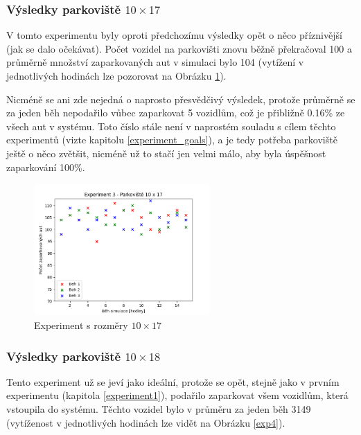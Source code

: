 \documentclass[11pt, a4paper]{article}
\begin{document}
\newpage

\subsubsection{Výsledky parkoviště \texorpdfstring{$10 \times 17$}{10 x 17}}
\label{experiment3}

V tomto experimentu byly oproti předchozímu výsledky opět o něco příznivější (jak se dalo očekávat). Počet vozidel na parkovišti znovu běžně překračoval 100 a průměrně množství zaparkovaných aut v simulaci bylo 104 (vytížení v jednotlivých hodinách lze pozorovat na Obrázku \ref{exp3}).

Nicméně se ani zde nejedná o naprosto přesvědčivý výsledek, protože průměrně se za jeden běh nepodařilo vůbec zaparkovat 5 vozidlům, což je přibližně 0.16\% ze všech aut v systému. Toto číslo stále není v naprostém souladu s cílem těchto experimentů (vizte kapitolu \ref{experiment_goals}), a je tedy potřeba parkoviště ještě o něco zvětšit, nicméně už to stačí jen velmi málo, aby byla úspěšnost zaparkování 100\%.

\begin{figure}[ht]
  \centering
  \includegraphics[width=0.6\textwidth]{img/exp3.png}
  \caption{Experiment s rozměry $10 \times 17$}
  \label{exp3}
\end{figure}

\newpage

\subsubsection{Výsledky parkoviště \texorpdfstring{$10 \times 18$}{10 x 18}}
\label{experiment4}

Tento experiment už se jeví jako ideální, protože se opět, stejně jako v prvním experimentu (kapitola \ref{experiment1}), podařilo zaparkovat všem vozidlům, která vstoupila do systému. Těchto vozidel bylo v průměru za jeden běh 3149 (vytíženost v jednotlivých hodinách lze vidět na Obrázku \ref{exp4}).
\end{document}
